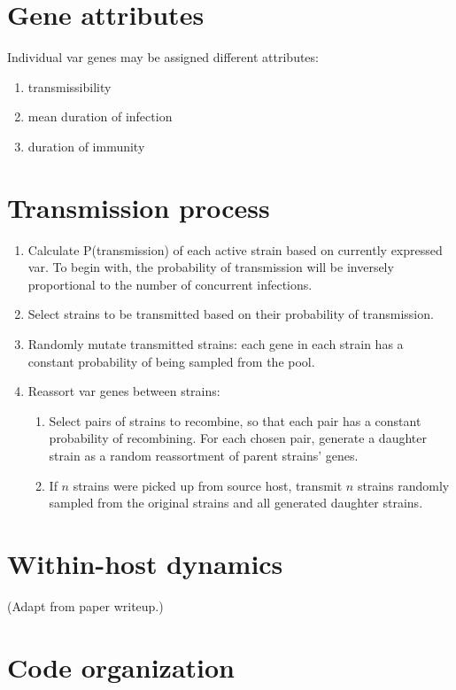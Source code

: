 \documentclass[11pt]{article}
\begin{document}
\section{Gene attributes}

Individual var genes may be assigned different attributes:

\begin{enumerate}
	\item transmissibility
	\item mean duration of infection
	\item duration of immunity
\end{enumerate}

\section{Transmission process}

\begin{enumerate}
	\item Calculate P(transmission) of each active strain based on currently expressed var. To begin with, the probability of transmission will be inversely proportional to the number of concurrent infections.
	\item Select strains to be transmitted based on their probability of transmission.
	\item Randomly mutate transmitted strains: each gene in each strain has a constant probability of being sampled from the pool.
	\item Reassort var genes between strains:
	\begin{enumerate}
		\item Select pairs of strains to recombine, so that each pair has a constant probability of recombining. For each chosen pair, generate a daughter strain as a random reassortment of parent strains' genes.
		\item If $n$ strains were picked up from source host, transmit $n$ strains randomly sampled from the original strains and all generated daughter strains.
	\end{enumerate}
\end{enumerate}

\section{Within-host dynamics}

(Adapt from paper writeup.)

\section{Code organization}
\end{document}
